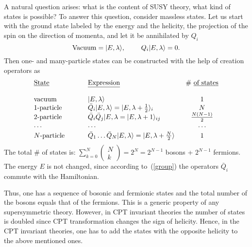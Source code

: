 \documentclass{cernyrep}
\begin{document}
A natural question arises: what is the content of SUSY theory, what kind of states is possible?
To answer this
question, consider massless states. Let us start with the
ground state labeled by the energy and the helicity, 
the projection of the spin on the direction of momenta, and
let it be annihilated by $Q_i$~\cite{WessB}
\begin{equation*}
{\rm Vacuum} =|E,\lambda \rangle, \ \ \ \ \ \ \
Q_i|E,\lambda \rangle = 0.
\end{equation*}
Then one- and many-particle states can be constructed with the
help of creation operators as
\begin{equation*}
\begin{array}{llc}
\mbox{\underline{State}~~~~~~~~~~~~~~} &
\mbox{\underline{Expression}~~~~~~~~~~~~~~~~~~~~~~~~~~} &
\# \ \mbox{\underline{of states}} \\  \\
\mbox{vacuum} & |E,\lambda \rangle & 1 \\
\mbox{1-particle} & \bar Q_i |E,\lambda \rangle =
|E,\lambda + \frac12 \rangle_i & N \\
\mbox{2-particle} & \bar Q_i \bar Q_j |E,\lambda  =
|E,\lambda + 1 \rangle_{ij} & \frac{N(N-1)}{2} \\
\ldots & \ldots & \ldots \\[1mm]
N\mbox{-particle} & \bar Q_1 \ldots \bar Q_N |E,\lambda \rangle =
|E,\lambda + \frac{N}{2} \rangle & 1
\end{array}
\end{equation*}
The total $\#$ of states is:
$\displaystyle
\sum_{k=0}^{N}\left(
\begin{array}{c}
N \\ k
\end{array}
\right) =2^N=2^{N-1}$
bosons + $2^{N-1}$ fermions.
The energy $E$ is not changed, since according to~(\ref{group})
the operators $\bar Q_i$ commute with the Hamiltonian.

Thus, one has a sequence of bosonic and fermionic states
and the total number of the bosons equals that of the
fermions. This is a generic property of any supersymmetric
theory. However, in CPT invariant theories the number of states
is doubled since CPT transformation changes the sign of 
helicity. Hence, in the CPT invariant theories, one has to add
the states with the opposite helicity to the above mentioned
ones.
\end{document}

